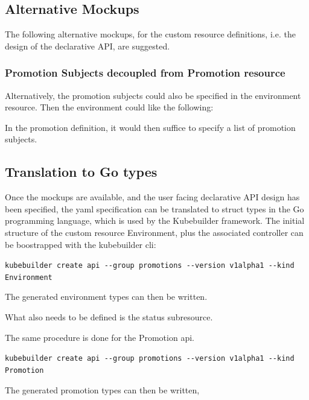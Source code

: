 \subsection*{Alternative Mockups}

The following alternative mockups,
for the custom resource definitions,
i.e. the design of the declarative API,
are suggested.

\subsubsection*{Promotion Subjects decoupled from Promotion resource}

Alternatively, the promotion subjects could also be specified
in the environment resource.
Then the environment could like the following:



In the promotion definition,
it would then suffice to specify
a list of promotion subjects.



\subsection*{Translation to Go types}

Once the mockups are available,
and the user facing declarative API design has been specified,
the yaml specification can be translated to struct types in the
Go programming language, which is used by the Kubebuilder framework.
The initial structure of the custom resource Environment,
plus the associated controller
can be boostrapped with the kubebuilder cli:

\lstinline|kubebuilder create api --group promotions --version v1alpha1 --kind Environment|

The generated environment types can then be written.



What also needs to be defined is the status subresource.



The same procedure is done for the Promotion api.

\lstinline|kubebuilder create api --group promotions --version v1alpha1 --kind Promotion|

The generated promotion types can then be written,

